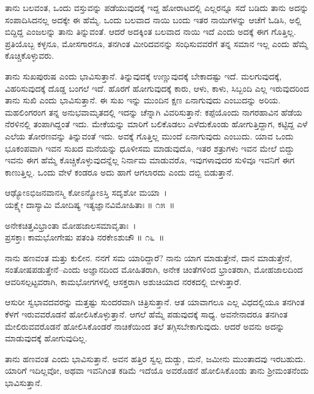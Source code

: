 ತಾನು ಬಲವಂತ, ಒಂದು ವಸ್ತುವನ್ನು ಪಡೆಯುವುದಕ್ಕೆ ಇದ್ದ ಹೋರಾಟದಲ್ಲಿ ಎಲ್ಲರನ್ನೂ ಸದೆ ಬಡಿದು ತಾನು ಅದನ್ನು ಸಂಪಾದಿಸಿದನಲ್ಲ ಅದಕ್ಕೇ ಈ ಹೆಮ್ಮೆ. ಒಂದು ಬಲವಾದ ನಾಯಿ ಬಂದು ಇತರ ನಾಯಿಗಳನ್ನು ಆಚೆಗೆ ಓಡಿಸಿ, ಅಲ್ಲಿ ಬಿದ್ದಿದ್ದ ಎಂಜಲನ್ನು ತಾನು ತಿನ್ನುವಂತೆ. ಆದರೆ ಅದಕ್ಕಿಂತ ಬಲವಾದ ನಾಯಿ ಇದೆ ಎಂದು ಅದಕ್ಕೆ ಈಗ ಗೊತ್ತಿಲ್ಲ. ಪ್ರತಿಯೊಬ್ಬ ಕಳ್ಳನೂ, ಮೋಸಗಾರನೂ, ತನಗಿಂತ ಮೀರಿದವನನ್ನು ಸಂಧಿಸುವವರೆಗೆ ತನ್ನ ಸಮಾನ ಇಲ್ಲ ಎಂದು ಹೆಮ್ಮೆ ಕೊಚ್ಚಿಕೊಳ್ಳುವರು.

ತಾನು ಸುಖಪುರುಷ ಎಂದು ಭಾವಿಸುತ್ತಾನೆ. ತಿನ್ನುವುದಕ್ಕೆ ಉಣ್ಣುವುದಕ್ಕೆ ಬೇಕಾದಷ್ಟು ಇದೆ. ಮಲಗುವುದಕ್ಕೆ, ವಿಹರಿಸುವುದಕ್ಕೆ ದೊಡ್ಡ ಬಂಗಲೆ ಇದೆ. ಹೊರಗೆ ಹೋಗುವುದಕ್ಕೆ ಕಾರು, ಆಳು, ಕಾಳು, ಸಿಬ್ಬಂದಿ ಎಲ್ಲ ಇರುವುದರಿಂದ ತಾನು ಸುಖಿ ಎಂದು ಭಾವಿಸುತ್ತಾನೆ. ಈ ಸುಖ ಇನ್ನು ಮುಂದಿನ ಕ್ಷಣ ಏನಾಗುವುದು ಎಂಬುದನ್ನು ಅರಿಯ. ಮಹಲಿಂಗರಂಗ ತನ್ನ ಅನುಭವಾಮೃತದಲ್ಲಿ ಇದನ್ನು ಚೆನ್ನಾಗಿ ವಿವರಿಸುತ್ತಾನೆ: ಕಪ್ಪೆಯೊಂದು ನಾಗರಹಾವಿನ ಹೆಡೆಯ ನೆರಳಿನಲ್ಲಿ ತಂಪಾಗಿದ್ದಂತೆ ಇದು. ಮೇಕೆಯನ್ನು ಮಾರಿಗೆ ಬಲಿಕೊಡಲು ಎಳೆದುಕೊಂಡು ಹೋಗುತ್ತಿದ್ದಾಗ, ಕಟ್ಟಿದ್ದ ಎಳೆ ಎಲೆಯ ತೋರಣವನ್ನು ತಿನ್ನುವಂತೆ ಇದು. ಅವಕ್ಕೆ ಗೊತ್ತಿಲ್ಲ ಮುಂದೆ ಏನಾಗುವುದು ಎಂಬುದು. ಯಾವ ಒಂದು ಭೂಕಂಪವಾಗಿ ಇವನ ಸುಖದ ಮನೆಯನ್ನು ಧೂಳೀಸಮ ಮಾಡುವುದೊ, ಇತರ ಶತ್ರುಗಳು ಇವನ ಮೇಲೆ ಬಿದ್ದು ಇವನು ಈಗ ಹೆಮ್ಮೆ ಕೊಚ್ಚಿಕೊಳ್ಳುವುದನ್ನೆಲ್ಲ ನಿರ್ನಾಮ ಮಾಡುವರೊ, ಇವುಗಳಾವುದರ ಸುಳಿವೂ ಇವನಿಗೆ ಈಗ ಕಾಣುತ್ತಿಲ್ಲ. ಒಂದು ವೇಳೆ ಕಂಡರೂ ಅದು ಹಾಗೆ ಆಗಲಾರದು ಎಂದು ದಬ್ಬಿ ಬಿಡುತ್ತಾನೆ.

\begin{shloka}
ಆಢ್ಯೋಽಭಿಜನವಾನಸ್ಮಿ ಕೋಽನ್ಯೋಽಸ್ತಿ ಸದೃಶೋ ಮಯಾ~।\\ಯಕ್ಷ್ಯೇ ದಾಸ್ಯಾಮಿ ಮೋದಿಷ್ಯ ಇತ್ಯಜ್ಞಾನವಿಮೋಹಿತಾಃ \hfill॥ ೧೫~॥
\end{shloka}

\begin{shloka}
ಅನೇಕಚಿತ್ತವಿಭ್ರಾಂತಾ ಮೋಹಜಾಲಸಮಾವೃತಾಃ~।\\ಪ್ರಸಕ್ತಾಃ ಕಾಮಭೋಗೇಷು ಪತಂತಿ ನರಕೇಽಶುಚೌ \hfill॥ ೧೬~॥
\end{shloka}

\begin{artha}
ನಾನು ಹಣವಂತ ಮತ್ತು ಕುಲೀನ. ನನಗೆ ಸಮ ಯಾರಿದ್ದಾರೆ? ನಾನು ಯಾಗ ಮಾಡುತ್ತೇನೆ, ದಾನ ಮಾಡುತ್ತೇನೆ, ಸಂತೋಷಪಡುತ್ತೇನೆ–ಎಂದು ಅಜ್ಞಾನದಿಂದ ಮೋಹಿತರಾಗಿ, ಅನೇಕ ಚಿಂತೆಗಳಿಂದ ಭ್ರಾಂತರಾಗಿ, ಮೋಹಜಾಲದಿಂದ ಆವರಿಸಲ್ಪಟ್ಟವರಾಗಿ, ಕಾಮಭೋಗಗಳಲ್ಲಿ ಆಸಕ್ತರಾಗಿ ಅಶುಚಿಯಾದ ನರಕದಲ್ಲಿ ಬೀಳುತ್ತಾರೆ.
\end{artha}

ಆಸುರೀ ಸ್ವಭಾವದವರನ್ನು ಮತ್ತಷ್ಟು ಸುಂದರವಾಗಿ ಚಿತ್ರಿಸುತ್ತಾನೆ. ಆತ ಯಾವಾಗಲೂ ಎಲ್ಲ ವಿಧದಲ್ಲಿಯೂ ತನಗಿಂತ ಕೆಳಗೆ ಇರುವವರೊಡನೆ ಹೋಲಿಸಿಕೊಳ್ಳುತ್ತಾನೆ. ಆಗಲೆ ಹೆಮ್ಮೆ ಪಡುವುದಕ್ಕೆ ಸಾಧ್ಯ. ಅವನೇನಾದರೂ ತನಗಿಂತ ಮೇಲಿರುವವರೊಡನೆ ಹೋಲಿಸಿಕೊಂಡರೆ ನಾಚಿಕೆಯಿಂದ ತಲೆ ತಗ್ಗಿಸಬೇಕಾಗುವುದು. ಆದರೆ ಅವನು ಅದನ್ನು ಮಾಡುವುದಕ್ಕೆ ಹೋಗುವುದಿಲ್ಲ.

ತಾನು ಹಣವಂತ ಎಂದು ಭಾವಿಸುತ್ತಾನೆ. ಅವನ ಹತ್ತಿರ ಸ್ವಲ್ಪ ದುಡ್ಡು, ಮನೆ, ಜಮೀನು ಮುಂತಾದವು ಇರಬಹುದು. ಯಾರಿಗೆ ಇದಿಲ್ಲವೋ, ಅಥವಾ ಇವನಿಗಿಂತ ಕಡಿಮೆ ಇದೆಯೊ ಅವರೊಡನೆ ಹೋಲಿಸಿಕೊಂಡು ತಾನು ಶ‍್ರೀಮಂತನೆಂದು ಭಾವಿಸುತ್ತಾನೆ.

